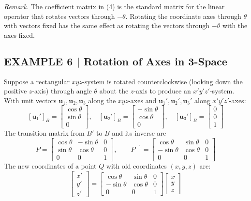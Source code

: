 \documentclass{article}
\theoremstyle{mystyle}
\begin{document}
\textit{Remark.} The coefficient matrix in (4) is the standard matrix for the linear
operator that rotates vectors through $-\theta$. Rotating the coordinate axes through
$\theta$ with vectors fixed has the same effect as rotating the vectors through $-\theta$
with the axes fixed.

\subsection*{EXAMPLE 6 | Rotation of Axes in 3-Space}

Suppose a rectangular $xyz$-system is rotated counterclockwise (looking down the positive
$z$-axis) through angle $\theta$ about the $z$-axis to produce an $x'y'z'$-system.
With unit vectors $\mathbf{u}_1,\mathbf{u}_2,\mathbf{u}_3$ along the $xyz$-axes and
$\mathbf{u}_1',\mathbf{u}_2',\mathbf{u}_3'$ along $x'y'z'$-axes:
\[
  [\mathbf{u}_1']_B = \begin{bmatrix}\cos\theta\\\sin\theta\\0\end{bmatrix}, \quad
  [\mathbf{u}_2']_B = \begin{bmatrix}-\sin\theta\\\cos\theta\\0\end{bmatrix}, \quad
  [\mathbf{u}_3']_B = \begin{bmatrix}0\\0\\1\end{bmatrix}
\]
The transition matrix from $B'$ to $B$ and its inverse are
\[
  P = \begin{bmatrix}\cos\theta & -\sin\theta & 0\\\sin\theta & \cos\theta & 0\\0 & 0 & 1\end{bmatrix},
  \qquad
  P^{-1} = \begin{bmatrix}\cos\theta & \sin\theta & 0\\-\sin\theta & \cos\theta & 0\\0 & 0 & 1\end{bmatrix}
\]
The new coordinates of a point $Q$ with old coordinates $(x,y,z)$ are:
\[
  \begin{bmatrix}x'\\y'\\z'\end{bmatrix}
  = \begin{bmatrix}\cos\theta & \sin\theta & 0\\-\sin\theta & \cos\theta & 0\\0 & 0 & 1\end{bmatrix}
    \begin{bmatrix}x\\y\\z\end{bmatrix}
\]
\end{document}
